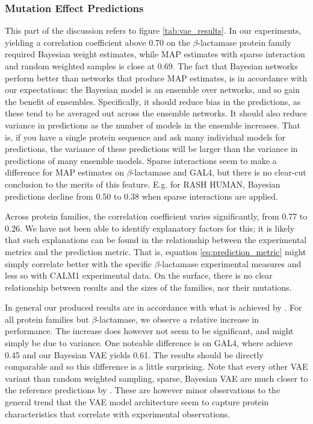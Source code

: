 \subsubsection{Mutation Effect Predictions}
This part of the discussion refers to figure \ref{tab:vae_results}. In our experiments, yielding a correlation coefficient above 0.70 on the $\beta$-lactamase protein family required Bayesian weight estimates, while MAP estimates with sparse interaction and random weighted samples is close at 0.69. The fact that Bayesian networks perform better than networks that produce MAP estimates, is in accordance with our expectations: the Bayesian model is an ensemble over networks, and so gain the benefit of ensembles. Specifically, it should reduce bias in the predictions, as these tend to be averaged out across the ensemble networks. It should also reduce variance in predictions as the number of models in the ensemble increases. That is, if you have a single protein sequence and ask many individual models for predictions, the variance of these predictions will be larger than the variance in predictions of many ensemble models. Sparse interactions seem to make a difference for MAP estimates on $\beta$-lactamase and GAL4, but there is no clear-cut conclusion to the merits of this feature. E.g. for RASH HUMAN, Bayesian predictions decline from 0.50 to 0.38 when sparse interactions are applied.

Across protein families, the correlation coefficient varies significantly, from 0.77 to 0.26. We have not been able to identify explanatory factors for this; it is likely that such explanations can be found in the relationship between the experimental metrics and the prediction metric. That is, equation \ref{eq:prediction_metric} might simply correlate better with the specific $\beta$-lactamase experimental measures and less so with CALM1 experimental data. On the surface, there is no clear relationship between results and the sizes of the families, nor their mutations.

In general our produced results are in accordance with what is achieved by \textcite{riesselman2018deep}. For all protein families but $\beta$-lactamase, we observe a relative increase in performance. The increase does however not seem to be significant, and might simply be due to variance. One noteable difference is on GAL4, where \textcite{riesselman2018deep} achieve 0.45 and our Bayesian VAE yields 0.61. The results should be directly comparable and so this difference is a little surprising. Note that every other VAE variant than random weighted sampling, sparse, Bayesian VAE are much closer to the reference predictions by \textcite{riesselman2018deep}. These are however minor observations to the general trend that the VAE model architecture seem to capture protein characteristics that correlate with experimental observations.

